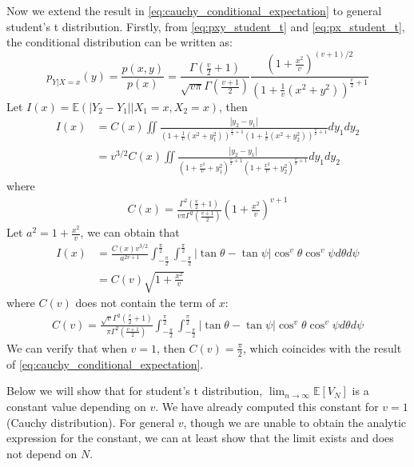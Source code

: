 \documentclass{article}
\def\E{\mathbb{E}}
\begin{document}
Now we extend the result in \eqref{eq:cauchy_conditional_expectation}
to general student's t distribution.
Firstly, from \eqref{eq:pxy_student_t} 
and \eqref{eq:px_student_t},
the conditional distribution can be written as:
\begin{equation*}
    p_{Y|X=x}(y) = \frac{p(x,y)}{p(x)}
    = \frac{\Gamma\left( \frac{v}{2} + 1 \right)}
    {\sqrt{v\pi} \Gamma \left( \frac{v+1}{2} \right)}
    \frac{\left( 1+\frac{x^2}{v} \right)^{(v+1)/2}}
    {\left(1+\frac{1}{v}(x^2+y^2) \right)^{\frac{v}{2}+1}}
\end{equation*}
Let $I(x)=\E(|Y_2-Y_1| \Big\vert X_1= x, X_2=x)$, then
\begin{align*}
   I(x) &= C(x) \iint \frac{|y_2-y_1|
     }{
    \left(1+\frac{1}{v}(x^2+y_1^2) \right)^{\frac{v}{2}+1}
    \left(1+\frac{1}{v}(x^2+y_2^2) \right)^{\frac{v}{2}+1}}
    dy_1dy_2 \\
    & = v^{3/2} C(x)\iint \frac{|y_2-y_1|
    }{
    \left(1+\frac{x^2}{v}+y_1^2 \right)^{\frac{v}{2}+1}
    \left(1+\frac{x^2}{v}+y_2^2 \right)^{\frac{v}{2}+1}
   }
   dy_1dy_2 
\end{align*}
where
\begin{align*}
    C(x) = \frac{\Gamma^2\left( \frac{v}{2} + 1 \right)}
    {v\pi \Gamma^2 \left( \frac{v+1}{2} \right)}
    \left(1+\frac{x^2}{v} \right)^{v+1}
\end{align*}
Let $a^2=1+\frac{x^2}{v}$, we can obtain that
\begin{align*}
    I(x) &= \frac{C(x)v^{3/2}}{a^{2v+1}}
    \int_{-\frac{\pi}{2}}^{\frac{\pi}{2}}
    \int_{-\frac{\pi}{2}}^{\frac{\pi}{2}}
    |\tan \theta - \tan \psi|
    \cos^v\theta \cos^v \psi
    d\theta d\psi \\
    &= C(v)\sqrt{1+\frac{x^2}{v}}
\end{align*}
where $C(v)$ does not contain the term of $x$:
\begin{align*}
    C(v) = \frac{\sqrt{v}\Gamma^2\left( \frac{v}{2} + 1 \right)}
    {\pi \Gamma^2 \left( \frac{v+1}{2} \right)}
    \int_{-\frac{\pi}{2}}^{\frac{\pi}{2}}
    \int_{-\frac{\pi}{2}}^{\frac{\pi}{2}}
    |\tan \theta - \tan \psi|
    \cos^v\theta \cos^v \psi
    d\theta d\psi 
\end{align*}
We can verify that when $v=1$, then $C(v) = \frac{\pi}{2}$,
which coincides with the result of
\eqref{eq:cauchy_conditional_expectation}.

Below we will show that for student's t distribution,
$\lim_{n \to \infty} \E[V_N]$ is a constant value depending on $v$.
We have already computed this constant for $v=1$(Cauchy distribution).
For general $v$, though we are unable to obtain the analytic expression
for the constant, we can at least show that the limit exists and does not depend on $N$.
\end{document}
